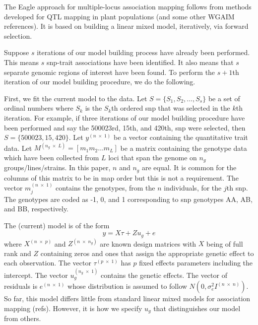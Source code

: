 \documentclass{nature}
\begin{document}
The Eagle approach for multiple-locus association mapping follows from methods developed for QTL mapping in plant 
populations \cite{verbyla2007analysis} (and some other WGAIM references). 
It is based on building a linear mixed model, iteratively, via forward 
selection.  


Suppose $s$ iterations of our model building process have already been performed. This means $s$ snp-trait 
associations have been identified.  It also means that $s$ separate genomic regions of interest have been found.  
To perform the $s+1$th  iteration of 
our model building procedure, we do the following. 

First, we fit the current model to the data. 
Let $S = \{ S_1, S_2, \ldots, S_s\}$ be a set of ordinal numbers where $S_k$ is the $S_k$th ordered snp that was 
selected in the $k$th iteration. For example, if three iterations of our model building procedure 
have been performed and say the 500023rd, 15th, and 420th, 
snp were selected, then $S=\{500023, 15, 420\}$. 
Let $y^{(n \; \times \;1)}$ be a vector containing the quantitative trait data. 
Let $M^{(n_g \; \times \; L)} = [m_1 m_2 \ldots m_L]$ be a matrix containing the genotype data which have been collected 
from $L$ loci that span the genome on $n_g$ groups/lines/strains.  In this paper, $n$ and $n_g$ are equal. 
 It is common for the columns of this matrix to be in map order but this is not a requirement. 
The vector $m_j^{(n \; \times \; 1)}$ contains the genotypes, from the $n$ individuals,  for the $j$th snp. 
The genotypes are coded as -1, 0, and 1 corresponding to snp genotypes AA, AB, and BB, respectively. 

The (current) model is of the form 
\begin{equation}
\label{eq1}
y = X \tau + Z u_g + e
\end{equation}
where 
$X^{(n \; \times \; p)}$ and $Z^{( n \; \times \; n_g)}$ are known design matrices with $X$ being of full rank and $Z$ 
containing zeros and ones that assign the appropriate genetic effect to each observation. 
The vector 
$\tau^{(p \; \times \; 1)}$ has $p$ fixed effects parameters including the intercept. The vector 
$u_g^{(n_g \; \times \; 1)}$ contains the 
genetic effects. The vector of residuals is 
$e^{(n \; \times \;1)}$ whose distribution is assumed to follow $N(0, \sigma^2_e I^{(n \; \times \; n)})$. 
So far,  this model differs little from standard linear mixed models for association mapping (refs). 
However, 
it is how we specify $u_g$ that distinguishes our model from others. 
\end{document}
